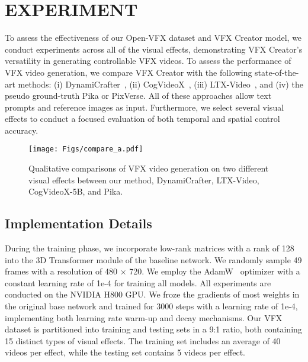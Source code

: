 \section{EXPERIMENT}
To assess the effectiveness of our Open-VFX dataset and VFX Creator model, we conduct experiments across all of the visual effects, demonstrating VFX Creator's versatility in generating controllable VFX videos. To assess the performance of VFX video generation, we compare VFX Creator with the following state-of-the-art methods: (i) DynamiCrafter~\cite{xing2025dynamicrafter}, (ii) CogVideoX~\cite{yang2024cogvideox}, (iii) LTX-Video~\cite{hacohen2024ltx}, and (iv) the pseudo ground-truth Pika or PixVerse. All of these approaches allow text prompts and reference images as input. Furthermore, we select several visual effects to conduct a focused evaluation of both temporal and spatial control accuracy. 
\begin{figure*}[htbp]
    \centering
    \texttt{[image: Figs/compare\_a.pdf]}
    \caption{Qualitative comparisons of VFX video generation on two different visual effects between our method, DynamiCrafter, LTX-Video, CogVideoX-5B, and Pika.}
    \label{fig:compare}
\end{figure*}

\subsection{Implementation Details}
During the training phase, we incorporate low-rank matrices with a rank of 128 into the 3D Transformer module of the baseline network. We randomly sample 49 frames with a resolution of 480 × 720. We employ the AdamW~\cite{loshchilov2017decoupled} optimizer with a constant learning rate of 1e-4 for training all models. All experiments are conducted on the NVIDIA H800 GPU.
We froze the gradients of most weights in the original base network and trained for 3000 steps with a learning rate of 1e-4, implementing both learning rate warm-up and decay mechanisms.
Our VFX dataset is partitioned into training and testing sets in a 9:1 ratio, both containing 15 distinct types of visual effects. The training set includes an average of 40 videos per effect, while the testing set contains 5 videos per effect. 

